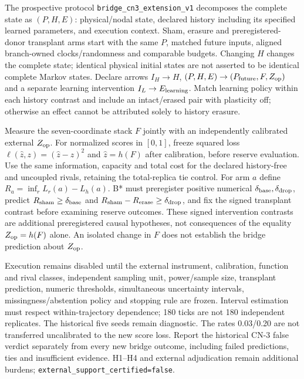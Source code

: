\documentclass[11pt,a4paper]{article}
\theoremstyle{definition}
\begin{document}
The prospective protocol \texttt{bridge\_cn3\_extension\_v1} decomposes the
complete state as $(P,H,E)$: physical/nodal state, declared history including
its specified learned parameters, and execution context. Sham, erasure and
preregistered-donor transplant arms start with the same $P$, matched future
inputs, aligned branch-owned clocks/randomness and comparable budgets.
Changing $H$ changes the complete state; identical physical initial states
are not asserted to be identical complete Markov states. Declare arrows
$I_H\to H$, $(P,H,E)\to(P_{\rm future},F,Z_{\rm op})$ and a separate learning
intervention $I_L\to E_{\rm learning}$. Match learning policy within each
history contrast and include an intact/erased pair with plasticity off;
otherwise an effect cannot be attributed solely to history erasure.

Measure the seven-coordinate stack $F$ jointly with an independently
calibrated external $Z_{\rm op}$. For normalized scores in $[0,1]$, freeze
squared loss $\ell(\hat z,z)=(\hat z-z)^2$ and $\hat z=h(F)$ after calibration,
before reserve evaluation. Use the same information, capacity and total cost
for the declared history-free and uncoupled rivals, retaining the total-replica
tie control. For arm $a$ define $R_a=\inf_r L_r(a)-L_h(a)$.
B* must preregister positive numerical $\delta_{\rm base},\delta_{\rm drop}$,
predict $R_{\rm sham}\ge\delta_{\rm base}$ and
$R_{\rm sham}-R_{\rm erase}\ge\delta_{\rm drop}$, and fix the signed transplant
contrast before examining reserve outcomes. These signed intervention contrasts are additional preregistered causal
hypotheses, not consequences of the equality $Z_{\rm op}=h(F)$ alone.
An isolated change in $F$ does not establish the bridge prediction about
$Z_{\rm op}$.

Execution remains disabled until the external instrument, calibration,
function and rival classes, independent sampling unit, power/sample size,
transplant prediction, numeric thresholds, simultaneous uncertainty intervals,
missingness/abstention policy and stopping rule are frozen. Interval estimation
must respect within-trajectory dependence; 180 ticks are not 180 independent
replicates. The historical five seeds remain diagnostic. The rates 0.03/0.20
are not transferred uncalibrated to the new score loss. Report the historical
CN-3 false verdict separately from every new bridge outcome, including failed
predictions, ties and insufficient evidence. H1--H4 and external adjudication
remain additional burdens; \texttt{external\_support\_certified=false}.
\end{document}
